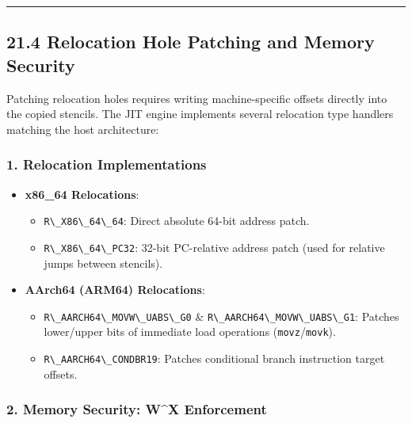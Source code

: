\begin{center}\rule{0.5\linewidth}{0.5pt}\end{center}

\hypertarget{relocation-hole-patching-and-memory-security}{%
\subsection{21.4 Relocation Hole Patching and Memory
Security}\label{relocation-hole-patching-and-memory-security}}

Patching relocation holes requires writing machine-specific offsets
directly into the copied stencils. The JIT engine implements several
relocation type handlers matching the host architecture:

\hypertarget{relocation-implementations}{%
\subsubsection{1. Relocation
Implementations}\label{relocation-implementations}}

\begin{itemize}
\tightlist
\item
  \textbf{x86\_64 Relocations}:

  \begin{itemize}
  \tightlist
  \item
    \passthrough{\lstinline!R\_X86\_64\_64!}: Direct absolute 64-bit
    address patch.
  \item
    \passthrough{\lstinline!R\_X86\_64\_PC32!}: 32-bit PC-relative
    address patch (used for relative jumps between stencils).
  \end{itemize}
\item
  \textbf{AArch64 (ARM64) Relocations}:

  \begin{itemize}
  \tightlist
  \item
    \passthrough{\lstinline!R\_AARCH64\_MOVW\_UABS\_G0!} \&
    \passthrough{\lstinline!R\_AARCH64\_MOVW\_UABS\_G1!}: Patches
    lower/upper bits of immediate load operations
    (\passthrough{\lstinline!movz!}/\passthrough{\lstinline!movk!}).
  \item
    \passthrough{\lstinline!R\_AARCH64\_CONDBR19!}: Patches conditional
    branch instruction target offsets.
  \end{itemize}
\end{itemize}

\hypertarget{memory-security-wx-enforcement}{%
\subsubsection{2. Memory Security: W\^{}X
Enforcement}\label{memory-security-wx-enforcement}}

